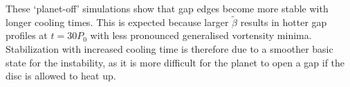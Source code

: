 These `planet-off' simulations show that gap edges become more stable with
longer cooling times. This is expected because larger $\tilde{\beta}$
results in hotter gap profiles at $t=30P_0$ with less pronounced
generalised vortensity minima. Stabilization with increased
cooling time is therefore due to a smoother basic state for the
instability, as it is more difficult for the planet to open a gap if
the disc is allowed to heat up. 

\begin{figure}
  \centering
\hfill
\hfill
  \subfigure{
}
\end{figure}
